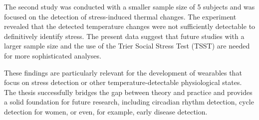 The second study was conducted with a smaller sample size of 5 subjects and was focused on the detection of stress-induced thermal changes. 
The experiment revealed that the detected temperature changes were not sufficiently detectable to definitively identify stress.
The present data suggest that future studies with a larger sample size and the use of the Trier Social Stress Test (TSST) are needed for more sophisticated analyses.

These findings are particularly relevant for the development of wearables that focus on stress detection or other temperature-detectable physiological states. 
The thesis successfully bridges the gap between theory and practice and provides a solid foundation for future research, including circadian rhythm detection, cycle detection for women, or even, for example, early disease detection.

\cleardoublepage


